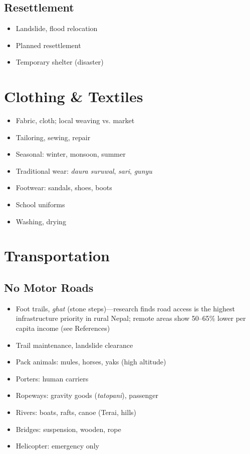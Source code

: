 \documentclass[11pt,a4paper]{article}
\begin{document}
\subsection{Resettlement}
\begin{itemize}
    \item Landslide, flood relocation
    \item Planned resettlement
    \item Temporary shelter (disaster)
\end{itemize}

\section{Clothing \& Textiles}

\begin{itemize}
    \item Fabric, cloth; local weaving vs. market
    \item Tailoring, sewing, repair
    \item Seasonal: winter, monsoon, summer
    \item Traditional wear: \textit{daura suruwal}, \textit{sari}, \textit{gunyu}
    \item Footwear: sandals, shoes, boots
    \item School uniforms
    \item Washing, drying
\end{itemize}

\section{Transportation}

\subsection{No Motor Roads}
\begin{itemize}
    \item Foot trails, \textit{ghat} (stone steps)---research finds road access is the highest infrastructure priority in rural Nepal; remote areas show 50--65\% lower per capita income (see References)
    \item Trail maintenance, landslide clearance
    \item Pack animals: mules, horses, yaks (high altitude)
    \item Porters: human carriers
    \item Ropeways: gravity goods (\textit{tatopani}), passenger
    \item Rivers: boats, rafts, canoe (Terai, hills)
    \item Bridges: suspension, wooden, rope
    \item Helicopter: emergency only
\end{itemize}
\end{document}

